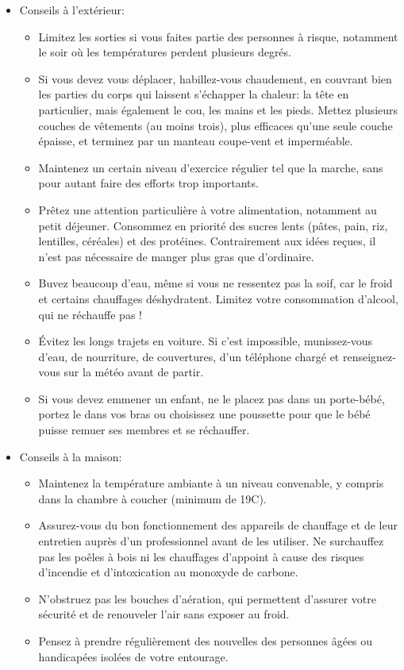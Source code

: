 \documentclass[11pt, french]{report}
\begin{document}
\begin{itemize}
\item Conseils à l'extérieur:
  \begin{itemize}
  \item Limitez les sorties si vous faites partie des personnes à risque, notamment le soir où les températures perdent plusieurs degrés.
  \item Si vous devez vous déplacer, habillez-vous chaudement, en couvrant bien les parties du corps qui laissent s'échapper la chaleur: la tête en particulier, mais également le cou, les mains et les pieds. Mettez plusieurs couches de vêtements (au moins trois), plus efficaces qu'une seule couche épaisse, et terminez par un manteau coupe-vent et imperméable.
  \item Maintenez un certain niveau d'exercice régulier tel que la marche, sans pour autant faire des efforts trop importants.
  \item Prêtez une attention particulière à votre alimentation, notamment au petit déjeuner. Consommez en priorité des sucres lents (pâtes, pain, riz, lentilles, céréales) et des protéines. Contrairement aux idées reçues, il n'est pas nécessaire de manger plus gras que d'ordinaire.
  \item Buvez beaucoup d'eau, même si vous ne ressentez pas la soif, car le froid et certains chauffages déshydratent. Limitez votre consommation d'alcool, qui ne réchauffe pas !
  \item Évitez les longs trajets en voiture. Si c'est impossible, munissez-vous d'eau, de nourriture, de couvertures, d'un téléphone chargé et renseignez-vous sur la météo avant de partir.
  \item  Si vous devez emmener un enfant, ne le placez pas dans un porte-bébé, portez le dans vos bras ou choisissez une poussette pour que le bébé puisse remuer ses membres et se réchauffer.
  \end{itemize}
\end{itemize}

\begin{itemize}
\item Conseils à la maison:
  \begin{itemize}
  \item Maintenez la température ambiante à un niveau convenable, y compris dans la chambre à coucher (minimum de 19\textdegree C).
  \item Assurez-vous du bon fonctionnement des appareils de chauffage et de leur entretien auprès d'un professionnel avant de les utiliser. Ne surchauffez pas les poêles à bois ni les chauffages d'appoint à cause des risques d'incendie et d'intoxication au monoxyde de carbone.
  \item N'obstruez pas les bouches d'aération, qui permettent d'assurer votre sécurité et de renouveler l'air sans exposer au froid.
  \item Pensez à prendre régulièrement des nouvelles des personnes âgées ou handicapées isolées de votre entourage.
  \end{itemize}
\end{itemize}
  
\end{document}
